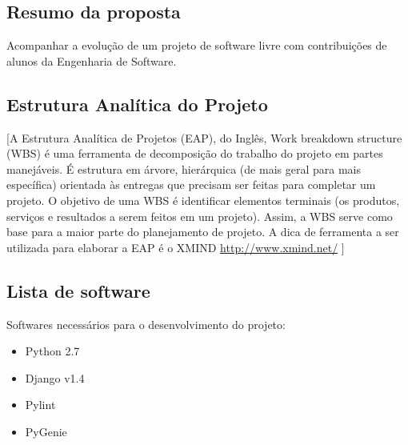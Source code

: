 



\subsection{Resumo da proposta} %
\label{sub:resumo_da_proposta}


Acompanhar a evolução de um projeto de software livre com contribuições de alunos da Engenharia de
Software.

\subsection{Estrutura Analítica do Projeto} %
\label{sub:estrutura_anal_tica_do_projeto}

[A Estrutura Analítica de Projetos (EAP), do Inglês, Work breakdown structure (WBS) é uma ferramenta de decomposição do trabalho do projeto em partes manejáveis. É estrutura em árvore, hierárquica (de mais geral para mais específica) orientada às entregas que precisam ser feitas para completar um projeto.
O objetivo de uma WBS é identificar elementos terminais (os produtos, serviços e resultados a serem feitos em um projeto). Assim, a WBS serve como base para a maior parte do planejamento de projeto.
A dica de ferramenta a ser utilizada para elaborar a EAP é o XMIND 
\url{http://www.xmind.net/} ]


\subsection{Lista de software} %
\label{sub:lista_de_software}

Softwares necessários para o desenvolvimento do projeto:
\begin{itemize}
	\item Python 2.7
	\item Django v1.4
	\item Pylint
	\item PyGenie
\end{itemize}


